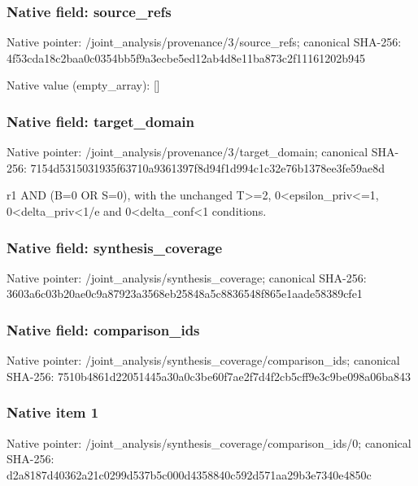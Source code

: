 \documentclass[10pt,a4paper]{article}
\begin{document}
\subsubsection{Native field: source\_\allowbreak{}refs}
Native pointer: /joint\_\allowbreak{}analysis/provenance/3/source\_\allowbreak{}refs; canonical SHA-256: 4f53cda18c2baa0c0354bb5f9a3ecbe5ed12ab4d8e11ba873c2f11161202b945

Native value (empty\_\allowbreak{}array): []

\subsubsection{Native field: target\_\allowbreak{}domain}
Native pointer: /joint\_\allowbreak{}analysis/provenance/3/target\_\allowbreak{}domain; canonical SHA-256: 7154d5315031935f63710a9361397f8d94f1d994c1c32e76b1378ee3fe59ae8d

\begingroup\raggedright\sloppy r1 AND (B=\allowbreak{}0 OR S=\allowbreak{}0),\allowbreak{} with the unchanged T>=\allowbreak{}2,\allowbreak{} 0<epsilon\_\allowbreak{}priv<=\allowbreak{}1,\allowbreak{} 0<delta\_\allowbreak{}priv<1/\allowbreak{}e and 0<delta\_\allowbreak{}conf<1 conditions.\par\endgroup

\subsubsection{Native field: synthesis\_\allowbreak{}coverage}
Native pointer: /joint\_\allowbreak{}analysis/synthesis\_\allowbreak{}coverage; canonical SHA-256: 3603a6c03b20ae0c9a87923a3568eb25848a5c8836548f865e1aade58389cfe1

\subsubsection{Native field: comparison\_\allowbreak{}ids}
Native pointer: /joint\_\allowbreak{}analysis/synthesis\_\allowbreak{}coverage/comparison\_\allowbreak{}ids; canonical SHA-256: 7510b4861d22051445a30a0c3be60f7ae2f7d4f2cb5cff9e3c9be098a06ba843

\subsubsection{Native item 1}
Native pointer: /joint\_\allowbreak{}analysis/synthesis\_\allowbreak{}coverage/comparison\_\allowbreak{}ids/0; canonical SHA-256: d2a8187d40362a21c0299d537b5c000d4358840c592d571aa29b3e7340e4850c
\end{document}
